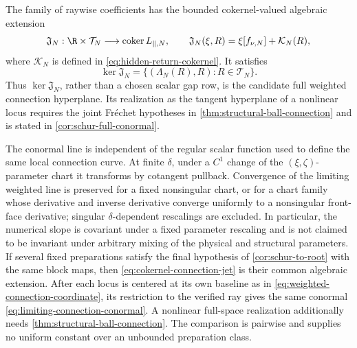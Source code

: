 \begin{theorem}
The family of raywise coefficients has the bounded cokernel-valued algebraic
extension
\begin{equation}
 \mathfrak J_N:\R\times\mathcal T_N
       \longrightarrow\operatorname{coker}L_{\parallel,N},
 \qquad
 \mathfrak J_N(\xi,R)
 =\xi[f_{\nu,N}]+\mathcal K_N(R),                   \label{eq:cokernel-connection-jet}
\end{equation}
where \(\mathcal K_N\) is defined in
\cref{eq:hidden-return-cokernel}.  It satisfies
\begin{equation}
 \ker\mathfrak J_N
 =\{(\Lambda_N(R),R):R\in\mathcal T_N\}.           \label{eq:cokernel-connection-kernel}
\end{equation}
Thus \(\ker\mathfrak J_N\), rather than a chosen scalar gap row, is the
candidate full weighted connection hyperplane.  Its realization as the
tangent hyperplane of a nonlinear locus requires the joint Fr\'{e}chet
hypotheses in \cref{thm:structural-ball-connection} and is stated in
\cref{cor:schur-full-conormal}.

The conormal line is independent of the regular scalar function used to
define the same local connection curve.  At finite \(\delta\), under a
\(C^1\) change of the \((\xi,\zeta)\)-parameter chart it transforms by
cotangent pullback.  Convergence of the limiting weighted line is preserved
for a fixed nonsingular chart, or for a chart family whose derivative and
inverse derivative converge uniformly to a nonsingular front-face derivative;
singular \(\delta\)-dependent rescalings are excluded.  In particular, the
numerical slope is covariant under a fixed parameter rescaling and is not
claimed to be invariant under arbitrary mixing of the physical and structural
parameters.  If several fixed preparations satisfy the final
hypothesis of \cref{cor:schur-to-root} with the same block maps, then
\cref{eq:cokernel-connection-jet} is their common algebraic extension.  After
each locus is centered at its own baseline as in
\cref{eq:weighted-connection-coordinate}, its restriction to the verified ray
gives the same conormal \cref{eq:limiting-connection-conormal}.  A nonlinear
full-space realization additionally needs
\cref{thm:structural-ball-connection}.  The comparison is pairwise and
supplies no uniform constant over an unbounded preparation class.
\end{theorem}

